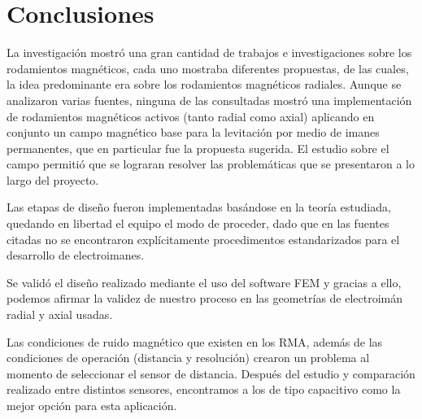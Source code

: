 \chapter{Conclusiones}


La investigaci\'on mostr\'o una gran cantidad de trabajos e investigaciones sobre los rodamientos magn\'eticos,  cada uno mostraba diferentes propuestas, de las cuales, la idea predominante era sobre los rodamientos magn\'eticos radiales. Aunque se analizaron varias fuentes, ninguna de las consultadas mostr\'o una implementaci\'on de rodamientos magn\'eticos activos (tanto radial como axial) aplicando en conjunto un campo magn\'etico base para la levitaci\'on por medio de imanes permanentes, que en particular fue la propuesta sugerida. El estudio sobre el campo permiti\'o que se lograran resolver las problem\'aticas que se presentaron a lo largo del proyecto. 

Las etapas de dise\~no fueron implementadas bas\'andose en la teor\'ia estudiada, quedando en libertad el equipo el modo de proceder, dado que en las fuentes citadas no se encontraron expl\'icitamente procedimentos estandarizados para el desarrollo de electroimanes.

Se valid\'o el dise\~no realizado mediante el uso del software FEM y gracias a ello, podemos afirmar la validez de nuestro proceso en las geometr\'ias de electroim\'an radial y axial usadas.

Las condiciones de ruido magn\'etico que existen en los RMA, adem\'as de las condiciones de operaci\'on (distancia y resoluci\'on) crearon un problema al momento de seleccionar el sensor de distancia. Despu\'es del estudio y comparaci\'on realizado entre distintos sensores, encontramos a los de tipo capacitivo como la mejor opci\'on para esta aplicaci\'on.

